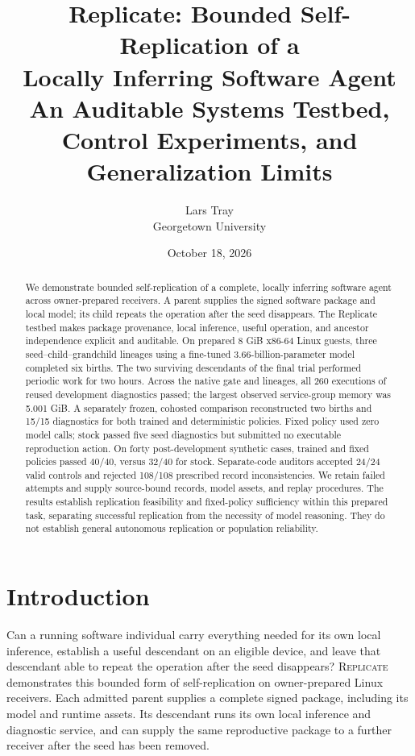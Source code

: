 \documentclass[11pt,letterpaper]{article}
\title{\textbf{Replicate: Bounded Self-Replication of a\\Locally Inferring Software Agent}\\[5pt]
\large An Auditable Systems Testbed, Control Experiments, and Generalization Limits}
\author{Lars Tray\\Georgetown University}
\date{October 18, 2026}
\newcommand{\sys}{\textsc{Replicate}}
\begin{document}
\maketitle
\begin{abstract}
We demonstrate bounded self-replication of a complete, locally inferring
software agent across owner-prepared receivers. A parent supplies the signed
software package and local model; its child repeats the operation after the
seed disappears. The Replicate testbed makes package provenance, local
inference, useful operation, and ancestor independence explicit and auditable.
On prepared 8 GiB x86-64 Linux guests, three seed--child--grandchild lineages
using a fine-tuned 3.66-billion-parameter model completed six births. The two
surviving descendants of the final trial performed periodic work for two hours.
Across the native gate and lineages, all 260 executions of reused development
diagnostics passed; the largest observed service-group memory was 5.001 GiB.
A separately frozen, cohosted comparison reconstructed two births and 15/15
diagnostics for both trained and deterministic policies. Fixed policy used
zero model calls; stock passed five seed diagnostics but submitted no executable
reproduction action. On forty post-development synthetic cases, trained and
fixed policies passed 40/40, versus 32/40 for stock. Separate-code auditors
accepted 24/24 valid controls and rejected 108/108 prescribed record
inconsistencies. We retain failed attempts and supply source-bound records,
model assets, and replay procedures. The results establish replication
feasibility and fixed-policy sufficiency within this prepared task, separating
successful replication from the necessity of model reasoning. They do not
establish general autonomous replication or population reliability.
\end{abstract}

\section{Introduction}

Can a running software individual carry everything needed for its own local
inference, establish a useful descendant on an eligible device, and leave that
descendant able to repeat the operation after the seed disappears? \sys{}
demonstrates this bounded form of self-replication on owner-prepared Linux
receivers. Each admitted parent supplies a complete signed package, including
its model and runtime assets. Its descendant runs its own local inference and
diagnostic service, and can supply the same reproductive package to a further
receiver after the seed has been removed.
\end{document}
